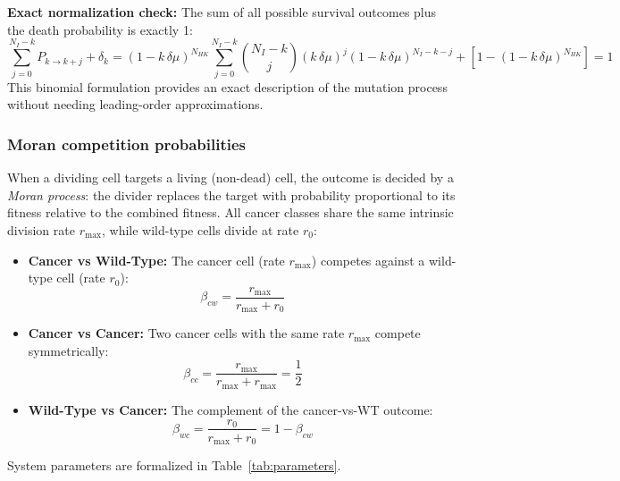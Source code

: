 \documentclass[11pt,a4paper]{article}
\begin{document}
\textbf{Exact normalization check:} The sum of all possible survival outcomes plus the death probability is exactly 1:
\begin{equation}
    \sum_{j=0}^{N_I - k} P_{k \to k+j} + \delta_k = (1 - k\,\delta\mu)^{N_{HK}} \sum_{j=0}^{N_I - k} \binom{N_I - k}{j} (k\,\delta\mu)^j (1 - k\,\delta\mu)^{N_I - k - j} + [1 - (1 - k\,\delta\mu)^{N_{HK}}] = 1
\end{equation}
This binomial formulation provides an exact description of the mutation process without needing leading-order approximations.

\subsubsection*{Moran competition probabilities}

When a dividing cell targets a living (non-dead) cell, the outcome is decided by a \emph{Moran process}: the divider replaces the target with probability proportional to its fitness relative to the combined fitness. All cancer classes share the same intrinsic division rate $r_{\text{max}}$, while wild-type cells divide at rate $r_0$:

\begin{itemize}
    \item \textbf{Cancer vs Wild-Type:} The cancer cell (rate $r_{\text{max}}$) competes against a wild-type cell (rate $r_0$):
    \begin{equation}
        \beta_{cw} = \frac{r_{\text{max}}}{r_{\text{max}} + r_0}
    \end{equation}
    \item \textbf{Cancer vs Cancer:} Two cancer cells with the same rate $r_{\text{max}}$ compete symmetrically:
    \begin{equation}
        \beta_{cc} = \frac{r_{\text{max}}}{r_{\text{max}} + r_{\text{max}}} = \frac{1}{2}
    \end{equation}
    \item \textbf{Wild-Type vs Cancer:} The complement of the cancer-vs-WT outcome:
    \begin{equation}
        \beta_{wc} = \frac{r_0}{r_{\text{max}} + r_0} = 1 - \beta_{cw}
    \end{equation}
\end{itemize}

System parameters are formalized in Table~\ref{tab:parameters}.
\end{document}
